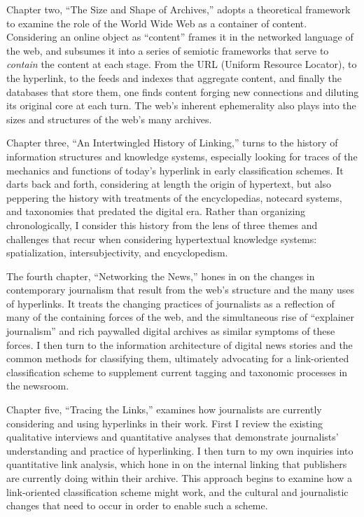 Chapter two, ``The Size and Shape of Archives,'' adopts a theoretical framework to examine the role of the World Wide Web as a container of content. Considering an online object as ``content'' frames it in the networked language of the web, and subsumes it into a series of semiotic frameworks that serve to \emph{contain} the content at each stage. From the URL (Uniform Resource Locator), to the hyperlink, to the feeds and indexes that aggregate content, and finally the databases that store them, one finds content forging new connections and diluting its original core at each turn. The web's inherent ephemerality also plays into the sizes and structures of the web's many archives.

Chapter three, ``An Intertwingled History of Linking,'' turns to the history of information structures and knowledge systems, especially looking for traces of the mechanics and functions of today's hyperlink in early classification schemes. It darts back and forth, considering at length the origin of hypertext, but also peppering the history with treatments of the encyclopedias, notecard systems, and taxonomies that predated the digital era. Rather than organizing chronologically, I consider this history from the lens of three themes and challenges that recur when considering hypertextual knowledge systems: spatialization, intersubjectivity, and encyclopedism.

The fourth chapter, ``Networking the News,'' hones in on the changes in contemporary journalism that result from the web's structure and the many uses of hyperlinks. It treats the changing practices of journalists as a reflection of many of the containing forces of the web, and the simultaneous rise of ``explainer journalism'' and rich paywalled digital archives as similar symptoms of these forces. I then turn to the information architecture of digital news stories and the common methods for classifying them, ultimately advocating for a link-oriented classification scheme to supplement current tagging and taxonomic processes in the newsroom.

Chapter five, ``Tracing the Links,'' examines how journalists are currently considering and using hyperlinks in their work. First I review the existing qualitative interviews and quantitative analyses that demonstrate journalists' understanding and practice of hyperlinking. I then turn to my own inquiries into quantitative link analysis, which hone in on the internal linking that publishers are currently doing within their archive. This approach begins to examine how a link-oriented classification scheme might work, and the cultural and journalistic changes that need to occur in order to enable such a scheme.

